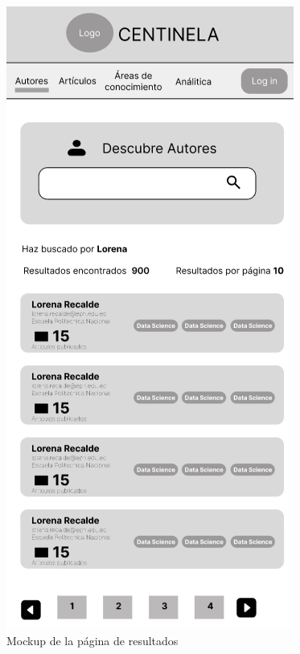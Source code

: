 \begin{figure}[H]
    \centering
    \includegraphics[scale=0.6]{../02Figures/02Chapter/Sprints/Sprint-1/mobile-first-results.png}
    \caption{Mockup de la página de resultados}
    \label{fig:mockup-results}
\end{figure}

